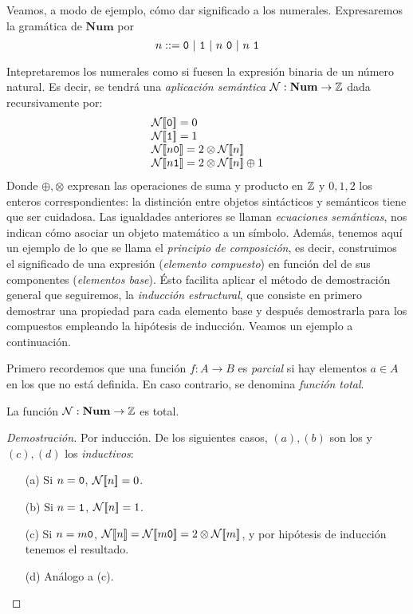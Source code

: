 Veamos, a modo de ejemplo, cómo dar significado a los numerales. Expresaremos la gramática de $\mathbf{Num}$ por
\[
    n ::= \n{0}\ |\ \n{1} \ |\ n\ \n{0} \ |\ n\ \n{1}
\]

Intepretaremos los numerales como si fuesen la expresión binaria de un número natural. Es decir, se tendrá una \textit{aplicación semántica} $\mathcal{N}: \mathbf{Num} \to \mathbb{Z}$ dada recursivamente por:
\[
    \begin{array}{l}
         \fc{\mc{N}}{\n{0}} = 0 \\
         \fc{\mc{N}}{\n{1}}= 1 \\
         \fc{\mc{N}}{n \n{0}} = 2\otimes \fc{\mc{N}}{n}\\
         \fc{\mc{N}}{n \n{1}} = 2\otimes \fc{\mc{N}}{n} \oplus 1
    \end{array}
\]
Donde $\oplus, \otimes$ expresan las operaciones de suma y producto en $\mathbb{Z}$ y $0, 1, 2$ los enteros correspondientes: la distinción entre objetos sintácticos y semánticos tiene que ser cuidadosa. Las igualdades anteriores se llaman \textit{ecuaciones semánticas}, nos indican cómo asociar un objeto matemático a un símbolo. Además, tenemos aquí un ejemplo de lo que se llama el \textit{principio de composición}, es decir, construimos el significado de una expresión (\textit{elemento compuesto}) en función del de sus componentes (\textit{elementos base}). Ésto facilita aplicar el método de demostración general que seguiremos, la \textit{inducción estructural}, que consiste en primero demostrar una propiedad para cada elemento base y después demostrarla para los compuestos empleando la hipótesis de inducción. Veamos un ejemplo a continuación.

Primero recordemos que una función $f: A \rightarrow B$ es \textit{parcial} si hay elementos $a\in A$ en los que no está definida. En caso contrario, se denomina \textit{función total}.

\begin{prop}
La función $\mathcal{N}: \mathbf{Num} \to \mathbb{Z}$ es total.
\end{prop}
\begin{proof}[Demostración]
Por inducción. De los siguientes casos, $(a), (b)$ son los  y $(c), (d)$ los \textit{inductivos}:
\begin{itemize}
    \item[(a)] Si $n = \texttt{0}$, $\mathcal{N}[\![n]\!] = 0$.
    \item[(b)] Si $n = \texttt{1}$, $\mathcal{N}[\![n]\!] = 1$.
    \item[(c)] Si $n = m\texttt{0}$, $\mathcal{N}[\![n]\!] = \mathcal{N}[\![m\texttt{0}]\!] = 2 \otimes \mathcal{N}[\![m]\!]$, y por hipótesis de inducción tenemos el resultado.
    \item[(d)] Análogo a (c).
\end{itemize}
\end{proof}

